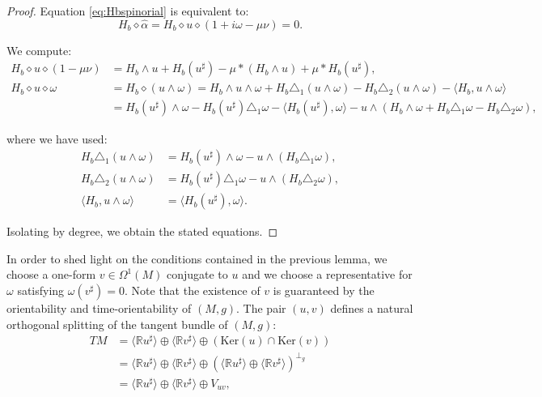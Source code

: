 \documentclass[10pt,a4paper,twoside,reqno]{amsart}
\theoremstyle{plain}
\theoremstyle{definition}
\theoremstyle{remark}
\newcommand{\escal}[1]{\langle#1\rangle}
\begin{document}
\begin{proof}
Equation \eqref{eq:Hbspinorial} is equivalent to:
\begin{equation*}
H_b \diamond \widehat{\alpha} = H_b\diamond u \diamond (1 + i\omega - \mu \nu) = 0.
\end{equation*}

\noindent
We compute:
\begin{align*}
H_b\diamond u\diamond(1-\mu\nu)&=H_b\wedge u+H_b(u^\sharp)-\mu*(H_b\wedge u)+\mu *H_b(u^\sharp),\\
H_b\diamond u\diamond\omega&=H_b\diamond(u\wedge\omega)=H_b\wedge u\wedge\omega+H_b\triangle_1(u\wedge\omega)-H_b\triangle_2(u\wedge\omega)-\escal{H_b,u\wedge\omega}\\
&=H_b(u^\sharp)\wedge\omega-H_b(u^\sharp)\triangle_1\omega-\escal{H_b(u^\sharp),\omega}-u\wedge(H_b\wedge\omega+H_b\triangle_1\omega-H_b\triangle_2\omega),
\end{align*}

\noindent
where we have used:
\begin{align*}
H_b\triangle_1(u\wedge\omega)&=H_b(u^\sharp)\wedge\omega-u\wedge(H_b\triangle_1\omega),\\
H_b\triangle_2(u\wedge\omega)&=H_b(u^\sharp)\triangle_1\omega-u\wedge(H_b\triangle_2\omega),\\
\escal{H_b,u\wedge\omega}&=\escal{H_b(u^\sharp),\omega}.
\end{align*}

Isolating by degree, we obtain the stated equations.
\end{proof}

\noindent
In order to shed light on the conditions contained in the previous lemma, we choose a one-form $v\in \Omega^1(M)$ conjugate to $u$ and we choose a representative for $\omega$ satisfying $\omega(v^\sharp)=0$. Note that the existence of $v$ is guaranteed by the orientability and time-orientability of $(M,g)$. The pair $(u,v)$ defines a natural orthogonal splitting of the tangent bundle of $(M,g)$:
\begin{align*}
TM &= \langle \mathbb{R} u^\sharp \rangle \oplus \langle \mathbb{R} v^\sharp \rangle \oplus (\mathrm{Ker}(u)\cap \mathrm{Ker}(v))\\
&= \langle \mathbb{R} u^\sharp \rangle \oplus \langle \mathbb{R} v^\sharp \rangle \oplus (\langle \mathbb{R} u^\sharp \rangle \oplus \langle \mathbb{R} v^\sharp \rangle)^{\perp_g}\\
&= \langle \mathbb{R} u^\sharp \rangle \oplus \langle \mathbb{R} v^\sharp \rangle \oplus V_{uv},
\end{align*}
\end{document}
